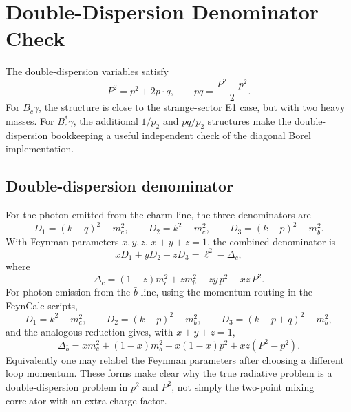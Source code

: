 \documentclass[11pt]{article}
\newcommand{\Bc}{B_c}
\newcommand{\Bcst}{B_c^\ast}
\begin{document}
\section{Double-Dispersion Denominator Check}

The double-dispersion variables satisfy
\[
P^2=p^2+2p\cdot q,\qquad pq=\frac{P^2-p^2}{2}.
\]
For \(\Bc\gamma\), the structure is close to the strange-sector E1 case, but
with two heavy masses.  For \(\Bcst\gamma\), the additional \(1/p_2\) and
\(pq/p_2\) structures make the double-dispersion bookkeeping a useful
independent check of the diagonal Borel implementation.

\subsection*{Double-dispersion denominator}

For the photon emitted from the charm line, the three denominators are
\[
D_1=(k+q)^2-m_c^2,\qquad
D_2=k^2-m_c^2,\qquad
D_3=(k-p)^2-m_b^2 .
\]
With Feynman parameters \(x,y,z\), \(x+y+z=1\), the combined denominator is
\[
xD_1+yD_2+zD_3
=\ell^2-\Delta_c,
\]
where
\[
\Delta_c=(1-z)m_c^2+z m_b^2-zy\,p^2-xz\,P^2 .
\]
For photon emission from the \(\bar b\) line, using the momentum routing in the
FeynCalc scripts,
\[
D_1=k^2-m_c^2,\qquad
D_2=(k-p)^2-m_b^2,\qquad
D_3=(k-p+q)^2-m_b^2 ,
\]
and the analogous reduction gives, with \(x+y+z=1\),
\[
\Delta_{\bar b}
=x m_c^2+(1-x)m_b^2-x(1-x)p^2+xz(P^2-p^2).
\]
Equivalently one may relabel the Feynman parameters after choosing a different
loop momentum.  These forms make clear why the true radiative problem is a
double-dispersion problem in \(p^2\) and \(P^2\), not simply the two-point mixing
correlator with an extra charge factor.
\end{document}
